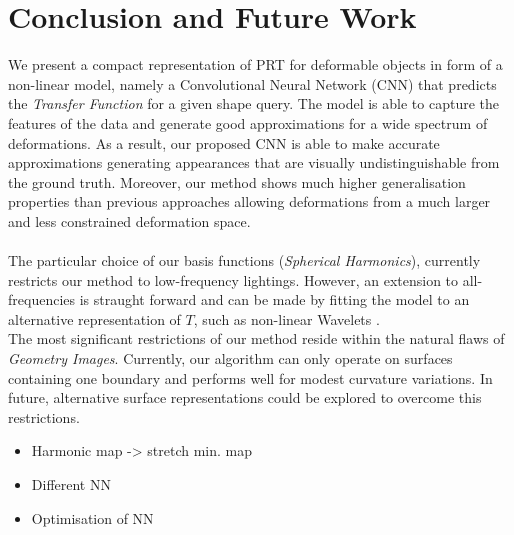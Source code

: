 \section{Conclusion and Future Work}
We present a compact representation of PRT for deformable objects in form of a non-linear model, namely a Convolutional Neural Network (CNN) that predicts the \textit{Transfer Function} for a given shape query. The model is able to capture the features of the data and generate good approximations for a wide spectrum of deformations.  As a result, our proposed CNN is able to make accurate approximations generating appearances that are visually undistinguishable from the ground truth. Moreover, our method shows much higher generalisation properties than previous approaches allowing deformations from a much larger and less constrained deformation space.\\
\\
The particular choice of our basis functions (\textit{Spherical Harmonics}), currently restricts our method to low-frequency lightings. However, an extension to all-frequencies is straught forward and can be made by fitting the model to an alternative representation of $T$, such as non-linear Wavelets \cite{AllFrequencyPRT}.\\
The most significant restrictions of our method reside within the natural flaws of \textit{Geometry Images}. Currently, our algorithm can only operate on surfaces containing one boundary and performs well for modest curvature variations. In future, alternative surface representations could be explored to overcome this restrictions.
\begin{itemize}
\item Harmonic map -> stretch min. map
\item Different NN
\item Optimisation of NN
\end{itemize}
